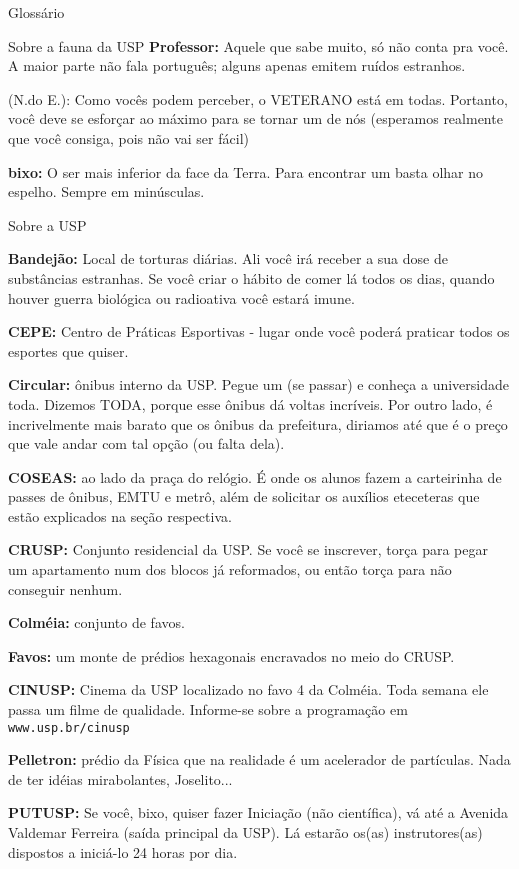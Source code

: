\begin{secao}{Glossário}
\begin{subsecao}{Sobre a fauna da USP}
{\bf Professor:} Aquele que sabe muito, só não conta pra você. A maior parte
não fala português; alguns apenas emitem ruídos estranhos.

(N.do E.): Como vocês podem perceber, o VETERANO está em todas. Portanto, você
deve se esforçar ao máximo para se tornar um de nós (esperamos realmente que
você consiga, pois não vai ser fácil)

{\bf bixo:} O ser mais inferior da face da Terra. Para encontrar um basta olhar
no espelho. Sempre em minúsculas.
\end{subsecao}

\begin{subsecao}{Sobre a USP}

{\bf Bandejão:} Local de torturas diárias. Ali você irá receber a sua dose de
substâncias estranhas. Se você criar o hábito de comer lá todos os dias, quando
houver guerra biológica ou radioativa você estará imune.

{\bf CEPE:} Centro de Práticas Esportivas - lugar onde você poderá praticar
todos os esportes que quiser.

{\bf Circular:} ônibus interno da USP. Pegue um (se passar) e conheça a
universidade toda. Dizemos TODA, porque esse ônibus dá voltas incríveis. Por
outro lado, é incrivelmente mais barato que os ônibus da prefeitura, diriamos
até que é o preço que vale andar com tal opção (ou falta dela).

{\bf COSEAS:} ao lado da praça do relógio. É onde os alunos fazem a carteirinha
de passes de ônibus, EMTU e metrô, além de solicitar os auxílios eteceteras que
estão explicados na seção respectiva.

{\bf CRUSP:} Conjunto residencial da USP. Se você se inscrever, torça para
pegar um apartamento num dos blocos já reformados, ou então torça para não
conseguir nenhum.

{\bf Colméia:} conjunto de favos.

{\bf Favos:} um monte de prédios hexagonais encravados no meio do CRUSP.

{\bf CINUSP:} Cinema da USP localizado no favo 4 da Colméia. Toda semana ele
passa um filme de qualidade. Informe-se sobre a programação em {\tt www.usp.br/cinusp}

{\bf Pelletron:} prédio da Física que na realidade é um acelerador de
partículas. Nada de ter idéias mirabolantes, Joselito...

{\bf PUTUSP:} Se você, bixo, quiser fazer Iniciação (não científica), vá até a
Avenida Valdemar Ferreira (saída principal da USP). Lá estarão os(as)
instrutores(as) dispostos a iniciá-lo 24 horas por dia.


\end{subsecao}
\end{secao}
